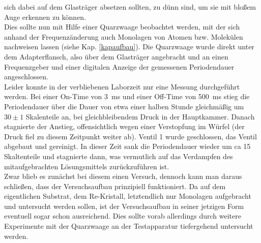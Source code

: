 sich dabei auf dem Glasträger absetzen sollten, zu dünn sind, um sie mit bloßem Auge
erkennen zu können.
\\
Dies sollte nun mit Hilfe einer Quarzwaage beobachtet werden, mit der sich anhand der
Frequenzänderung auch Monolagen von Atomen bzw. Molekülen nachweisen lassen (siehe Kap.
\ref{kapaufbau}). Die Quarzwaage wurde direkt unter dem Adapterflansch, also über dem Glasträger
angebracht und an einen Frequenzgeber und einer digitalen Anzeige der gemessenen Periodendauer
angeschlossen.
\\
Leider konnte in der verbliebenen Laborzeit nur eine Messung durchgeführt werden. Bei einer
On-Time von \SI{3}{ms} und einer Off-Time von \SI{500}{ms} stieg die Periodendauer über die Dauer
von etwa einer halben Stunde gleichmäßig um $30\pm1$ Skalenteile an, bei gleichbleibendem Druck in der
Hauptkammer. Danach stagnierte der Anstieg, offensichtlich wegen einer Verstopfung im Würfel (der
Druck fiel zu diesem Zeitpunkt weiter ab). Ventil 1 wurde geschlossen, das Ventil abgebaut und
gereinigt. In dieser Zeit sank die Periodendauer wieder um ca 15 Skaltenteile und stagnierte dann,
was vermutlich auf das Verdampfen des mitaufgebrachten Lösungsmittels zurückzuführen ist.
\\
Zwar blieb es zunächst bei diesem einen Versuch, dennoch kann man daraus schließen, dass der
Versuchsaufbau prinzipiell funktioniert. Da auf dem eigentlichen Substrat, dem Re-Kristall,
letztendlich nur Monolagen aufgebracht und untersucht werden sollen, ist der
Versuchsaufbau in seiner jetzigen Form eventuell sogar schon ausreichend. Dies sollte vorab
allerdings durch weitere Experimente mit der Quarzwaage an der Testapparatur tiefergehend untersucht
werden.


























